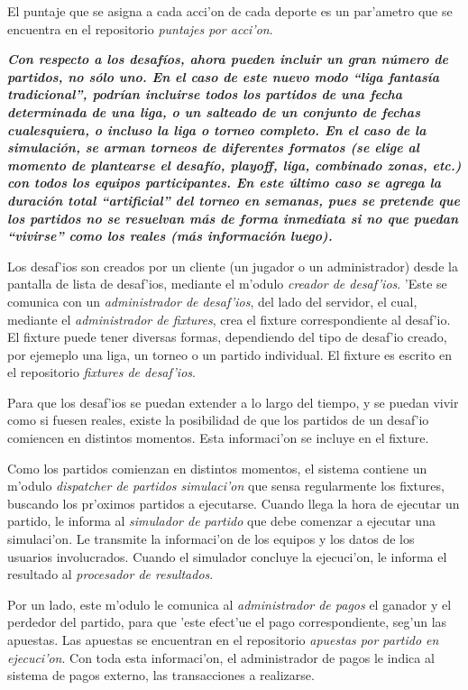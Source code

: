El puntaje que se asigna a cada acci'on de cada deporte es un par'ametro que se encuentra en el repositorio \textit{puntajes por acci'on}.

\textbf{\textit{Con respecto a los desafíos, ahora pueden incluir un gran número de partidos, no sólo uno. En el caso de este nuevo modo ``liga fantasía tradicional'', podrían incluirse todos los partidos de una fecha determinada de una liga, o un salteado de un conjunto de fechas cualesquiera, o incluso la liga o torneo completo.
En el caso de la simulación, se arman torneos de diferentes formatos (se elige al momento de plantearse el desafío, playoff, liga, combinado zonas, etc.) con todos los equipos participantes. En este último caso se agrega la duración total “artificial” del torneo en semanas, pues se pretende que los partidos no se resuelvan más de forma inmediata si no que puedan “vivirse” como los
reales (más información luego).
}}

Los desaf'ios son creados por un cliente (un jugador o un administrador) desde la pantalla de lista de desaf'ios, mediante el m'odulo \textit{creador de desaf'ios}. 'Este se comunica con un \textit{administrador de desaf'ios}, del lado del servidor, el cual, mediante el \textit{administrador de fixtures}, crea el fixture correspondiente al desaf'io. El fixture puede tener diversas formas, dependiendo del tipo de desaf'io creado, por ejemeplo una liga, un torneo o un partido individual. El fixture es escrito en el repositorio \textit{fixtures de desaf'ios}.

Para que los desaf'ios se puedan extender a lo largo del tiempo, y se puedan vivir como si fuesen reales, existe la posibilidad de que los partidos de un desaf'io comiencen en distintos momentos. Esta informaci'on se incluye en el fixture.

Como los partidos comienzan en distintos momentos, el sistema contiene un m'odulo \textit{dispatcher de partidos simulaci'on} que sensa regularmente los fixtures, buscando los pr'oximos partidos a ejecutarse. Cuando llega la hora de ejecutar un partido, le informa al \textit{simulador de partido} que debe comenzar a ejecutar una simulaci'on. Le transmite la informaci'on de los equipos y los datos de los usuarios involucrados. Cuando el simulador concluye la ejecuci'on, le informa el resultado al \textit{procesador de resultados}.

Por un lado, este m'odulo le comunica al \textit{administrador de pagos} el ganador y el perdedor del partido, para que 'este efect'ue el pago correspondiente, seg'un las apuestas. Las apuestas se encuentran en el repositorio \textit{apuestas por partido en ejecuci'on}. Con toda esta informaci'on, el administrador de pagos le indica al sistema de pagos externo, las transacciones a realizarse.

